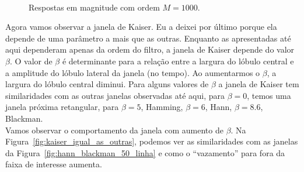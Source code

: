 \documentclass{homeworkclass}
\begin{document}
\begin{homeworkProblem}
\begin{figure}[!h]
	~
	
	\caption{Respostas em magnitude com ordem $M = 1000$.}
	\label{fig:hann_blackman_50_linha_milao}
\end{figure}

Agora vamos observar a janela de Kaiser. Eu a deixei por último porque ela depende de uma parâmetro a mais que as outras. Enquanto as apresentadas até aqui dependeram apenas da ordem do filtro, a janela de Kaiser depende do valor $\beta$. O valor de $\beta$ é determinante para a relação entre a largura do lóbulo central e a amplitude do lóbulo lateral da janela (no tempo). Ao aumentarmos o $\beta$, a largura do lóbulo central diminui. Para alguns valores de $\beta$ a janela de Kaiser tem similaridades com as outras janelas observadas até aqui, para $\beta = 0$, temos uma janela próxima retangular, para $\beta = 5$, Hamming, $\beta = 6$, Hann, $\beta = 8.6$, Blackman. \\


Vamos observar o comportamento da janela com aumento de $\beta$. Na Figura~\ref{fig:kaiser_igual_as_outras}, podemos ver as similaridades com as janelas da Figura~\ref{fig:hann_blackman_50_linha} e como o ``vazamento'' para fora da faixa de interesse aumenta.


\end{homeworkProblem}
\end{document}
